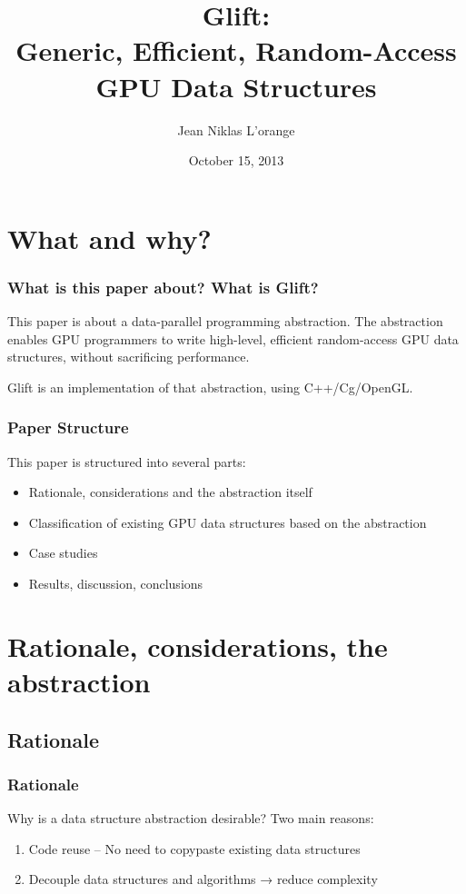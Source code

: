 \documentclass[xcolor={usenames,dvipsnames}]{beamer}
\title[Glift: Generic, Efficient, Random-Access GPU Data Structures]%
      {Glift:\\ Generic, Efficient, Random-Access GPU Data Structures}
\author{Jean Niklas L'orange}
\institute{\texttt{jeannikl@hypirion.com}}
\date{October 15, 2013}
\begin{document}
\begin{frame}
  \titlepage
\end{frame}

\section{What and why?}
\begin{frame}
  \frametitle{What is this paper about? What is Glift?}

  This paper is about a data-parallel programming abstraction. The abstraction
  enables GPU programmers to write high-level, efficient random-access GPU data
  structures, without sacrificing performance.

  \vfill \pause

  Glift is an implementation of that abstraction, using C++/Cg/OpenGL.
\end{frame}

\begin{frame}
  \frametitle{Paper Structure}

  This paper is structured into several parts:
  \begin{itemize}
  \item<2-> Rationale, considerations and the abstraction itself
  \item<3-> Classification of existing GPU data structures based on the
    abstraction
  \item<4-> Case studies
  \item<5-> Results, discussion, conclusions
  \end{itemize}
\end{frame}

\section{Rationale, considerations, the abstraction}
\subsection{Rationale}
\begin{frame}
  \frametitle{Rationale}

  Why is a data structure abstraction desirable? Two main reasons:
  \begin{enumerate}
  \item<2-> Code reuse -- No need to copypaste existing data structures
  \item<3-> Decouple data structures and algorithms → reduce complexity
  \end{enumerate}
\end{frame}
\end{document}

